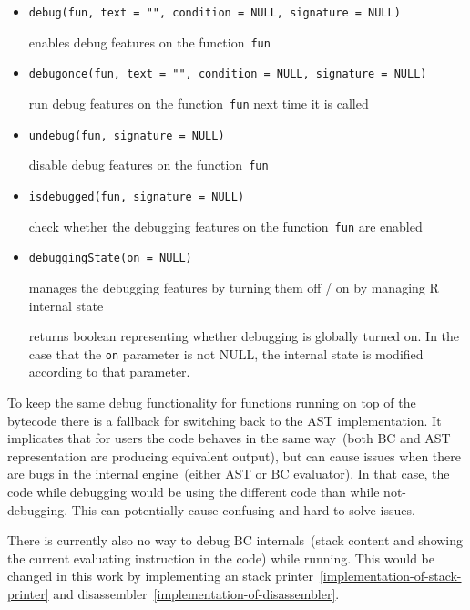 \documentclass[thesis=M,english]{FITthesis}[2018/10/20]
\newcommand{\code}[1]{\texttt{#1}}
\begin{document}
\begin{itemize}
	\item \code{debug(fun, text = "", condition = NULL, signature = NULL)}

	\hspace*{6mm} enables debug features on the function~\code{fun}

	\item \code{debugonce(fun, text = "", condition = NULL, signature = NULL)}

	\hspace*{6mm} run debug features on the function~\code{fun} next time it is called

	\item \code{undebug(fun, signature = NULL)}

	\hspace*{6mm} disable debug features on the function~\code{fun}

	\item \code{isdebugged(fun, signature = NULL)}

	\hspace*{6mm} check whether the debugging features on the function~\code{fun} are enabled

	\item \code{debuggingState(on = NULL)}

	\hspace*{6mm} manages the debugging features by turning them off / on by managing R internal state

	\hspace*{6mm} returns boolean representing whether debugging is globally turned on. In the case that the \code{on} parameter is not NULL, the internal state is modified according to that parameter.

\end{itemize}

To keep the same debug functionality for functions running on top of the bytecode there is a fallback for switching back to the AST implementation. It implicates that for users the code behaves in the same way~(both BC and AST representation are producing equivalent output), but can cause issues when there are bugs in the internal engine~(either AST or BC evaluator). In that case, the code while debugging would be using the different code than while not-debugging. This can potentially cause confusing and hard to solve issues. 

There is currently also no way to debug BC internals~(stack content and showing the current evaluating instruction in the code) while running. This would be changed in this work by implementing an stack printer~\ref{implementation-of-stack-printer} and disassembler~\ref{implementation-of-disassembler}.
\end{document}
